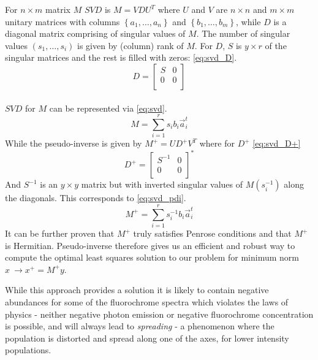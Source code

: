 For $n\times m$ matrix $M$ $SVD$ is $M=VDU^T$ where $U$ and $V$ are $n\times n$ and $m\times m$ unitary matrices with columns $\left\{a_1,\ldots,a_n\right\}$ and  $\left\{b_1,\ldots,b_m\right\}$, while $D$ is a diagonal matrix comprising of singular values of $M$. The number of singular values $\left(s_1,\ldots,s_i\right)$ is given by (column) rank of $M$. For $D$, $S$ is $y\times r$ of the singular matrices and the rest is filled with zeros: \cref{eq:svd_D}.
\begin{equation}
D=\left[\begin{matrix}S&0\\0&0\\\end{matrix}\right]
\label{eq:svd_D}
\end{equation}\\
$SVD$ for $M$ can be represented via \cref{eq:svd}.
\begin{equation}
M=\sum_{i=1}^{r}s_ib_i{\vec{a}}_i^t
\label{eq:svd}
\end{equation}
While the pseudo-inverse is given by $M^+=UD^+V^T$ where for $D^+$ \cref{eq:svd_D+}
\begin{equation}
D^+=\left[\begin{matrix}S^{-1}&0\\0&0\\\end{matrix}\right]^\ast
\label{eq:svd_D+}
\end{equation}
And $S^{-1}$ is an $y\times y$ matrix but with inverted singular values of $M \left(s_i^{-1}\right)$  along the diagonals. This corresponds to \cref{eq:svd_pdi}.
\begin{equation}
M^+=\sum_{i=1}^{r}s_i^{-1}b_i{\vec{a}}_i^t
\label{eq:svd_pdi}
\end{equation}
It can be further proven that $M^+$ truly satisfies Penrose conditions and that $M^+$ is Hermitian.\cite{gallier2020algebra}
Pseudo-inverse therefore gives us an efficient and robust way to compute the optimal least squares solution to our problem for minimum norm $\hat{x}\ \rightarrow x^+=M^+y$.\cite{gallier2020algebra}

While this approach provides a solution it is likely to contain negative abundances for some of the fluorochrome spectra  which violates the laws of physics - neither negative photon emission or negative fluorochrome concentration is possible, and will always lead to \emph{spreading} - a phenomenon where the population is distorted and spread along one of the axes, for lower intensity populations.\cite{unmix2013nonsq}

